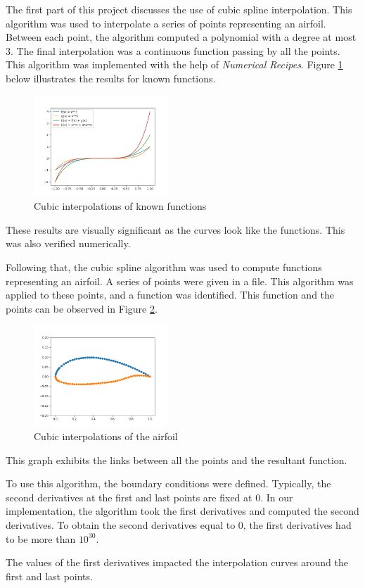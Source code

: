 The first part of this project discusses the use of cubic spline interpolation. This algorithm was used to interpolate a series of points representing an airfoil. Between each point, the algorithm computed a polynomial with a degree at most 3. The final interpolation was a continuous function passing by all the points. This algorithm was implemented with the help of \emph{Numerical Recipes}. Figure \ref{fig:interp} below illustrates the results for known functions.

\begin{figure}[h]
  \centering
  \includegraphics[width=0.45\textwidth]{img/interpolations.png}
  \caption{Cubic interpolations of known functions}
  \label{fig:interp}
\end{figure}

These results are visually significant as the curves look like the functions. This was also verified numerically.

\bigskip


Following that, the cubic spline algorithm was used to compute functions representing an airfoil. A series of points were given in a file. This algorithm was applied to these points, and a function was identified. This function and the points can be observed in Figure \ref{fig:airfoil}.

\begin{figure}[h]
  \centering
  \includegraphics[width=0.45\textwidth]{img/airfoil_interp.png}
  \caption{Cubic interpolations of the airfoil}
  \label{fig:airfoil}
\end{figure}
  
This graph exhibits the links between all the points and the resultant function.

\bigskip

To use this algorithm, the boundary conditions were defined. Typically, the second derivatives at the first and last points are fixed at 0. In our implementation, the algorithm took the first derivatives and computed the second derivatives. To obtain the second derivatives equal to 0, the first derivatives had to be more than $10^{30}$.

The values of the first derivatives impacted the interpolation curves around the first and last points.
